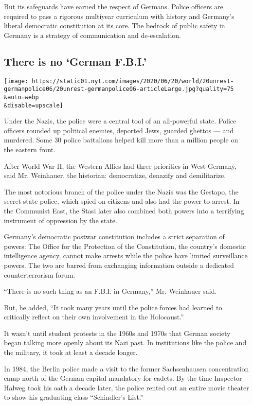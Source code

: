 But its safeguards have earned the respect of Germans. Police officers
are required to pass a rigorous multiyear curriculum with history and
Germany's liberal democratic constitution at its core. The bedrock of
public safety in Germany is a strategy of communication and
de-escalation.

\hypertarget{there-is-no-german-fbi}{%
\subsection{There is no `German F.B.I.'}\label{there-is-no-german-fbi}}

\texttt{[image: https://static01.nyt.com/images/2020/06/20/world/20unrest-germanpolice06/20unrest-germanpolice06-articleLarge.jpg?quality=75\\\&auto=webp\\\&disable=upscale]}

Under the Nazis, the police were a central tool of an all-powerful
state. Police officers rounded up political enemies, deported Jews,
guarded ghettos --- and murdered. Some 30 police battalions helped kill
more than a million people on the eastern front.

After World War II, the Western Allies had three priorities in West
Germany, said Mr. Weinhauer, the historian: democratize, denazify and
demilitarize.

The most notorious branch of the police under the Nazis was the Gestapo,
the secret state police, which spied on citizens and also had the power
to arrest. In the Communist East, the Stasi later also combined both
powers into a terrifying instrument of oppression by the state.

Germany's democratic postwar constitution includes a strict separation
of powers: The Office for the Protection of the Constitution, the
country's domestic intelligence agency, cannot make arrests while the
police have limited surveillance powers. The two are barred from
exchanging information outside a dedicated counterterrorism forum.

``There is no such thing as an F.B.I. in Germany,'' Mr. Weinhauer said.

But, he added, ``It took many years until the police forces had learned
to critically reflect on their own involvement in the Holocaust.''

It wasn't until student protests in the 1960s and 1970s that German
society began talking more openly about its Nazi past. In institutions
like the police and the military, it took at least a decade longer.

In 1984, the Berlin police made a visit to the former Sachsenhausen
concentration camp north of the German capital mandatory for cadets. By
the time Inspector Halweg took his oath a decade later, the police
rented out an entire movie theater to show his graduating class
``Schindler's List.''

